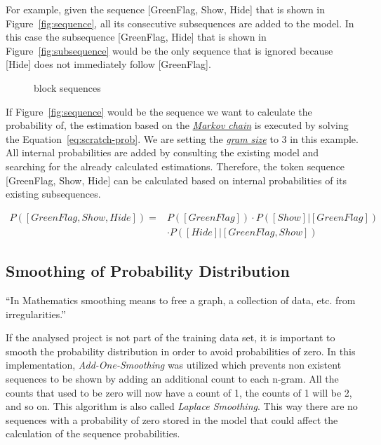 For example, given the sequence [GreenFlag, Show, Hide] that is shown in Figure~\ref{fig:sequence}, all its consecutive subsequences are added to the model. In this case the subsequence [GreenFlag, Hide] that is shown in Figure~\ref{fig:subsequence} would be the only sequence that is ignored because [Hide] does not immediately follow [GreenFlag]. 

\begin{figure}%
    \centering
    \qquad
    \caption[\scratch{} block sequences]{\label{fig:sequences}\scratch{} block sequences}%
\end{figure}

If Figure~\ref{fig:sequence} would be the sequence we want to calculate the probability of, the estimation based on the \hyperref[def:markov_chain]{\textit{Markov chain}} is executed by solving the Equation~\ref{eq:scratch-prob}. We are setting the \hyperref[def:gram size]{\textit{gram size}} to 3 in this example. All internal probabilities are added by consulting the existing model and searching for the already calculated estimations. Therefore, the token sequence [GreenFlag, Show, Hide] can be calculated based on internal probabilities of its existing subsequences.

\begin{equation} \label{eq:scratch-prob}
\begin{aligned}
P([GreenFlag, Show, Hide]) ={} & P([GreenFlag])\cdot P([Show]|[GreenFlag]) \\
							  & \cdot P([Hide]|[GreenFlag, Show])
\end{aligned}
\end{equation}


\subsection{Smoothing of Probability Distribution}\label{subsec:smoothing}

\begin{definition}[Smoothing]\label{def:smoothing}
	``In Mathematics smoothing means to free a graph, a collection of data, etc. from irregularities.''~\cite{smoothing}
\end{definition}

If the analysed project is not part of the training data set, it is important to smooth the probability distribution in order to avoid probabilities of zero. In this implementation, \textit{Add-One-Smoothing} was utilized which prevents non existent sequences to be shown by adding an additional count to each n-gram. All the counts that used to be zero will now have a count of 1, the counts of 1 will be 2, and so on. This algorithm is also called \textit{Laplace Smoothing}. This way there are no sequences with a probability of zero stored in the model that could affect the calculation of the sequence probabilities.

